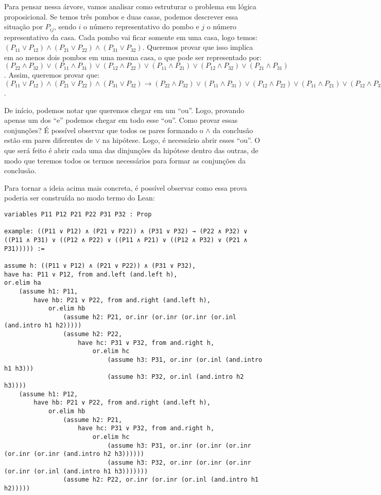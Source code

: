     Para pensar nessa árvore, vamos analisar como estruturar o problema em lógica proposicional. Se temos três pombos e duas casas, podemos descrever essa situação por $P_{ij}$, sendo $i$ o número representativo do pombo e $j$ o número representativo da casa. Cada pombo vai ficar somente em uma casa, logo temos: $(P_{11} \lor P_{12}) \land (P_{21} \lor P_{22}) \land (P_{31} \lor P_{32})$. Queremos provar que isso implica em ao menos dois pombos em uma mesma casa, o que pode ser representado por: $(P_{22} \land P_{32}) \lor (P_{11} \land P_{31}) \lor (P_{12} \land P_{22}) \lor (P_{11} \land P_{21}) \lor (P_{12} \land P_{32}) \lor (P_{21} \land P_{31})$. Assim, queremos provar que: $(P_{11} \lor P_{12}) \land (P_{21} \lor P_{22}) \land (P_{31} \lor P_{32}) \rightarrow (P_{22} \land P_{32}) \lor (P_{11} \land P_{31}) \lor (P_{12} \land P_{22}) \lor (P_{11} \land P_{21}) \lor (P_{12} \land P_{32}) \lor (P_{21} \land P_{31})$.
    
    De início, podemos notar que queremos chegar em um ``ou''. Logo, provando apenas um dos ``e'' podemos chegar em todo esse ``ou''. Como provar essas conjunções? É possível observar que todos os pares formando o $\land$ da conclusão estão em pares diferentes de $\lor$ na hipótese. Logo, é necessário abrir esses ``ou''. O que será feito é abrir cada uma das dinjunções da hipótese dentro das outras, de modo que teremos todos os termos necessários para formar as conjunções da conclusão. 
    
    
    
Para tornar a ideia acima mais concreta, é possível observar como essa prova poderia ser construída no modo termo do Lean: 
\begin{lstlisting}
variables P11 P12 P21 P22 P31 P32 : Prop

example: ((P11 ∨ P12) ∧ (P21 ∨ P22)) ∧ (P31 ∨ P32) → (P22 ∧ P32) ∨ ((P11 ∧ P31) ∨ ((P12 ∧ P22) ∨ ((P11 ∧ P21) ∨ ((P12 ∧ P32) ∨ (P21 ∧ P31))))) :=

assume h: ((P11 ∨ P12) ∧ (P21 ∨ P22)) ∧ (P31 ∨ P32),
have ha: P11 ∨ P12, from and.left (and.left h),
or.elim ha
    (assume h1: P11, 
        have hb: P21 ∨ P22, from and.right (and.left h),
            or.elim hb
                (assume h2: P21, or.inr (or.inr (or.inr (or.inl (and.intro h1 h2)))))
                (assume h2: P22, 
                    have hc: P31 ∨ P32, from and.right h,
                        or.elim hc
                            (assume h3: P31, or.inr (or.inl (and.intro h1 h3)))
                            (assume h3: P32, or.inl (and.intro h2 h3))))
    (assume h1: P12, 
        have hb: P21 ∨ P22, from and.right (and.left h),
            or.elim hb
                (assume h2: P21, 
                    have hc: P31 ∨ P32, from and.right h,
                        or.elim hc
                            (assume h3: P31, or.inr (or.inr (or.inr (or.inr (or.inr (and.intro h2 h3))))))
                            (assume h3: P32, or.inr (or.inr (or.inr (or.inr (or.inl (and.intro h1 h3)))))))
                (assume h2: P22, or.inr (or.inr (or.inl (and.intro h1 h2)))))
\end{lstlisting}

